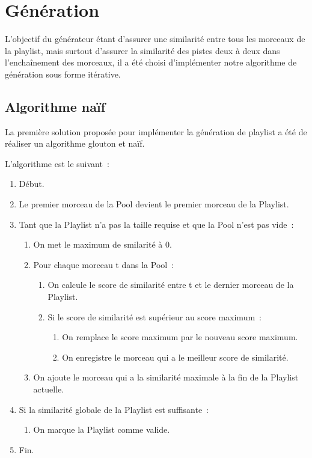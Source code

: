\section{Génération}
\label{impl:generation}

L'objectif du générateur étant d'assurer une similarité entre tous les
morceaux de la playlist, mais surtout d'assurer la similarité des pistes deux
à deux dans l'enchaînement des morceaux, il a été choisi d'implémenter notre
algorithme de génération sous forme itérative.

\subsection{Algorithme naïf}
\label{impl:selection:naif}

La première solution proposée pour implémenter la génération de playlist a été
de réaliser un algorithme glouton et naïf.\newline

L'algorithme est le suivant~:

\begin{enumerate}
  \item Début.
  \item Le premier morceau de la Pool devient le premier morceau de la Playlist.
  \item Tant que la Playlist n'a pas la taille requise et que la Pool n'est pas
vide~:
  \begin{enumerate}
    \item On met le maximum de smilarité à 0.
    \item Pour chaque morceau t dans la Pool~:
    \begin{enumerate}
      \item On calcule le score de similarité entre t et le dernier morceau
      de la Playlist.
      \item Si le score de similarité est supérieur au score maximum~:
      \begin{enumerate}
        \item On remplace le score maximum par le nouveau score maximum.
        \item On enregistre le morceau qui a le meilleur score de similarité.
      \end{enumerate}
    \end{enumerate}
    \item On ajoute le morceau qui a la similarité maximale à la fin de la
    Playlist actuelle.
  \end{enumerate}
  \item Si la similarité globale de la Playlist est suffisante~:
  \begin{enumerate}
    \item On marque la Playlist comme valide.
  \end{enumerate}
  \item Fin.
\end{enumerate}

